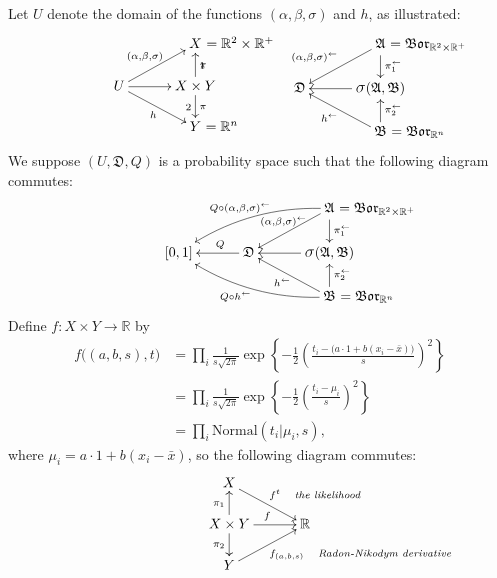 \documentclass[
twoside=true,
paper=letter,
fontsize=9pt,
pagesize=auto,
leqno,
openany,
headsepline,
overfullrule,
]{scrbook}
\theoremstyle{plain}
\theoremstyle{plain}
\theoremstyle{definition}
\theoremstyle{bfnoteitalic}
\theoremstyle{bfnoteroman}
\newcommand{\sigalg}[1]{\mathfrak{#1}}
\newcommand{\borel}{\mathfrak{Bor}}
\newcommand{\sagb}{\mathop{\hbox{\large{$\sigma$}}}\nolimits}
\newcommand{\preimage}[1]{\mathop{#1^{\leftarrow}}}
\newcommand{\R}{\mathbb{R}}
\newcommand{\productsig}[2]{\sagb(#1,#2)}
\newcommand{\function}{f}
\newcommand{\measurespace}{X}
\newcommand{\measurespaceii}{Y}
\newcommand{\projectionone}{\pi_1}
\newcommand{\projectiontwo}{\pi_2}
\newcommand{\pspace}{\measurespace}%
\newcommand{\sspace}{\measurespaceii}%
\newcommand{\sspacesig}{\sigalg{B}}
\newcommand{\pspacesig}{\sigalg{A}}
\begin{document}
Let $U$ denote the domain of the functions $(\alpha, \beta,\sigma)$ and  $h$, as illustrated:
\[
\xymatrix@R=16pt@C=30pt{ 
 & \pspace \makebox[0pt][l]{ $=\R^2\times\R^+$}
 \\
 U \ar[ur]^{(\alpha, \beta,\sigma)}
 \ar[dr]_h
 \ar[r] &
 \pspace\times\sspace \ar[u]_\projectionone \ar[d]^\projectiontwo
 \\
  & \sspace\makebox[0pt][l]{ $= \R^n$}
  \\
}
%
\hspace{50pt}
%
\xymatrix@R=16pt@C=30pt{ 
 & \pspacesig \makebox[0pt][l]{ $=\borel_{\R^2\times\R^+}$}
 \ar[dl]_{\makebox[0pt][r]{$\scriptstyle\preimage{(\alpha,\beta,\sigma)}$}}
 \ar[d]^{\preimage{\projectionone}}
 \\
 \sigalg{D}  & 
 \productsig{\pspacesig}{\sspacesig} 
 \ar[l]  
 \\
  & \sspacesig \makebox[0pt][l]{ $=\borel_{\R^n}$}
  \ar[u]_{\preimage{\projectiontwo}}
  \ar[ul]^{\makebox[0pt][r]{$\scriptstyle\preimage{h}$}}
  \\
}
\]
We suppose $(U,\sigalg{D},Q)$ is a probability space such that the following diagram commutes:
\[
\xymatrix@R=16pt@C=30pt{ 
 & & \pspacesig \rlap{ $=\borel_{\R^2\times\R^+}$}
 \ar[dl]_{\kern30pt\preimage{(\alpha,\beta,\sigma)}} 
 \ar[d]^{\preimage{\projectionone}}
 \ar@/_10pt/[lld]_{Q\circ \preimage{(\alpha,\beta,\sigma)}}
 \\
 [0,1] & \sigalg{D} \ar[l]_-{\ Q} & 
 \productsig{\pspacesig}{\sspacesig} 
 \ar[l]  
 \\
 & & \sspacesig \rlap{ $=\borel_{\R^n}$}
  \ar[u]_{\preimage{\projectiontwo}}
  \ar[ul]^{\preimage{h}}
  \ar@/^10pt/[llu]^{Q\circ\preimage{h}\quad}
  \\
}
\]
Define $\function:\pspace \times \sspace \to\R$ by
\begin{align*}
\function\bigl((a,b,s),t\bigr)
& =
\prod_i
\frac{1}{s\sqrt{2\pi}}
\exp
\left\{
-\frac{1}{2}
\left(
\frac{t_i-\bigl( a\cdot 1 + b(x_i-\bar x) \bigr)}{s}
\right)^2
\right\} \\
& = 
\prod_i
\frac{1}{s\sqrt{2\pi}}
\exp
\left\{
-\frac{1}{2}
\left(
\frac{t_i-\mu_i}{s}
\right)^2
\right\} \\
& =
\prod_i
\text{Normal}(t_i\vert \mu_i, s),
\end{align*}
where $\mu_i=a\cdot 1 + b(x_i-\bar x)$,
so the following diagram commutes:
\[
\xymatrix@R=16pt@C=30pt{ 
\pspace
\ar[dr]^{\makebox[0pt][l]{$\scriptstyle{\function^t \quad \emph{\scriptsize the likelihood}}$}}
& \\
\pspace\times\sspace 
\ar[u]^{\projectionone}
\ar[d]_{\projectiontwo}
\ar[r]^{\function}
& \R \\
\sspace 
\ar[ur]_{\makebox[0pt][l]{$\scriptstyle{\function_{(a,b,s)} \quad \emph{\scriptsize Radon-Nikodym derivative}}$}}
& 
}
\]
\end{document}
